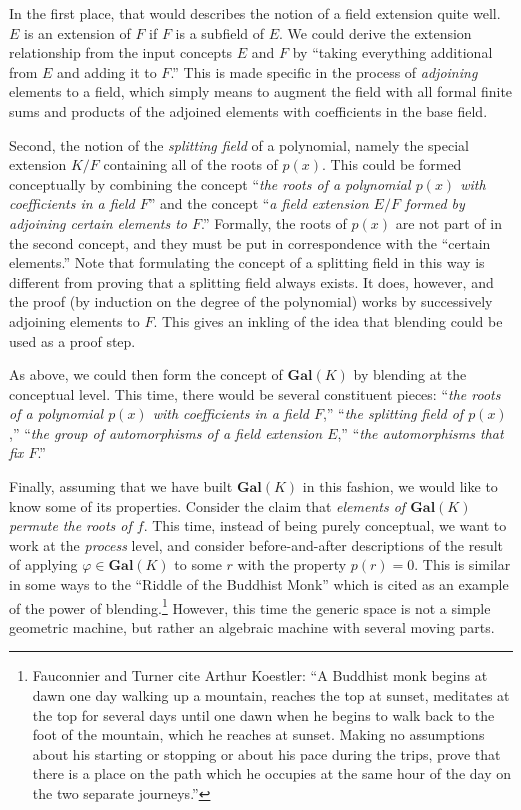 In the first place, that would describes the notion of a field
extension quite well.  $E$ is an extension of $F$ if $F$ is a subfield of $E$.
We could derive the extension relationship from the input concepts $E$
and $F$ by ``taking everything additional from $E$ and adding it to
$F$.''  This is made specific in the process of \emph{adjoining}
elements to a field, which simply means to augment the field with all
formal finite sums and products of the adjoined elements with
coefficients in the base field.

Second, the notion of the \emph{splitting field} of a polynomial,
namely the special extension $K/F$ containing all of the roots of
$p(x)$.  This could be formed conceptually by combining the concept
``\emph{the roots of a polynomial $p(x)$ with coefficients in a field
  $F$}'' and the concept ``\emph{a field extension $E/F$ formed by
  adjoining certain elements to $F$}.''  Formally, the roots of $p(x)$
are not part of in the second concept, and they must be put in
correspondence with the ``certain elements.''  Note that formulating
the concept of a splitting field in this way is different from proving
that a splitting field always exists.  It does, however, and the proof
(by induction on the degree of the polynomial) works by successively
adjoining elements to $F$.  This gives an inkling of the idea that
blending could be used as a proof step.

As above, we could then form the concept of $\mathbf{Gal}(K)$ by blending
at the conceptual level.  This time, there would be several constituent pieces:
``\emph{the roots of a polynomial $p(x)$ with coefficients in a field $F$},''
``\emph{the splitting field of $p(x)$},''
``\emph{the group of automorphisms of a field extension $E$},''
``\emph{the automorphisms that fix $F$}.''

Finally, assuming that we have built $\mathbf{Gal}(K)$ in this
fashion, we would like to know some of its properties.  Consider the
claim that \emph{elements of $\mathbf{Gal}(K)$ permute the roots of
  $f$}.  This time, instead of being purely conceptual, we want to
work at the \emph{process} level, and consider before-and-after
descriptions of the result of applying $\varphi\in\mathbf{Gal}(K)$ to
some $r$ with the property $p(r)=0$.  This is similar in some ways to
the ``Riddle of the Buddhist Monk'' \cite{Fau98} which is cited as
an example of the power of blending.\footnote{Fauconnier and Turner
  cite Arthur Koestler: ``A Buddhist monk begins at dawn one day
  walking up a mountain, reaches the top at sunset, meditates at the
  top for several days until one dawn when he begins to walk back to
  the foot of the mountain, which he reaches at sunset.  Making no
  assumptions about his starting or stopping or about his pace during
  the trips, prove that there is a place on the path which he occupies
  at the same hour of the day on the two separate journeys.''}
However, this time the generic space is not a simple geometric machine,
but rather an algebraic machine with several moving parts.

